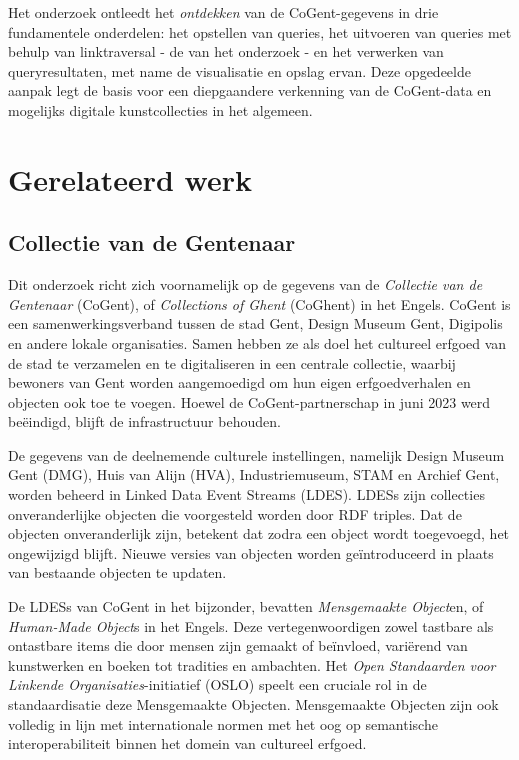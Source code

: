 \documentclass[conference]{IEEEtran}
\begin{document}
Het onderzoek ontleedt het \textit{ontdekken} van de CoGent-gegevens in drie fundamentele onderdelen: het opstellen van queries, het uitvoeren van queries met behulp van linktraversal - de van het onderzoek - en het verwerken van queryresultaten, met name de visualisatie en opslag ervan. Deze opgedeelde aanpak legt de basis voor een diepgaandere verkenning van de CoGent-data en mogelijks digitale kunstcollecties in het algemeen.

\section{Gerelateerd werk}

\subsection{Collectie van de Gentenaar}
Dit onderzoek richt zich voornamelijk op de gegevens van de \textit{Collectie van de Gentenaar} (CoGent), of \textit{Collections of Ghent} (CoGhent) in het Engels. CoGent is een samenwerkingsverband tussen de stad Gent, Design Museum Gent, Digipolis en andere lokale organisaties. Samen hebben ze als doel het cultureel erfgoed van de stad te verzamelen en te digitaliseren in een centrale collectie, waarbij bewoners van Gent worden aangemoedigd om hun eigen erfgoedverhalen en objecten ook toe te voegen. Hoewel de CoGent-partnerschap in juni 2023 werd beëindigd, blijft de infrastructuur behouden. \cite{leemputten2022gent} \cite{schouppe2022gent}

De gegevens van de deelnemende culturele instellingen, namelijk Design Museum Gent (DMG), Huis van Alijn (HVA), Industriemuseum, STAM en Archief Gent, worden beheerd in Linked Data Event Streams (LDES). LDESs zijn collecties onveranderlijke objecten die voorgesteld worden door RDF triples. Dat de objecten onveranderlijk zijn, betekent dat zodra een object wordt toegevoegd, het ongewijzigd blijft. Nieuwe versies van objecten worden geïntroduceerd in plaats van bestaande objecten te updaten. \cite{floreverk2022coghent} \cite{colpaert2023ldes}

De LDESs van CoGent in het bijzonder, bevatten \textit{Mensgemaakte Object}en, of \textit{Human-Made Object}s in het Engels. Deze vertegenwoordigen zowel tastbare als ontastbare items die door mensen zijn gemaakt of beïnvloed, variërend van kunstwerken en boeken tot tradities en ambachten. Het \textit{Open Standaarden voor Linkende Organisaties}-initiatief (OSLO) speelt een cruciale rol in de standaardisatie deze Mensgemaakte Objecten. Mensgemaakte Objecten zijn ook volledig in lijn met internationale normen met het oog op semantische interoperabiliteit binnen het domein van cultureel erfgoed. \cite{van2022publishing} \cite{vanderperren2021oslo}
\end{document}
